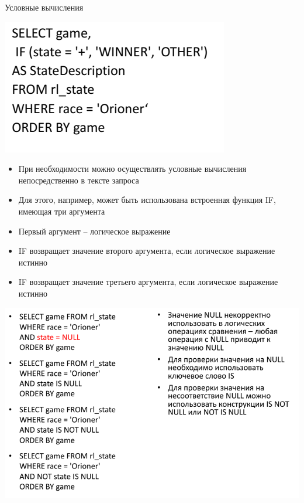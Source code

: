 \documentclass{beamer}
\begin{document}
\begin{frame}{Условные вычисления}
	\begin{minipage}{0.4\textwidth}
		\begin{flushleft}	
			\begin{center}
				\includegraphics[scale=0.5]{images/sql-05.png}
			\end{center}
		\end{flushleft}  	
	\end{minipage}
	\begin{minipage}{0.5\textwidth}
		\begin{flushright}
			\begin{itemize}
				\item При необходимости можно осуществлять условные вычисления непосредственно в тексте запроса
				\item Для этого, например, может быть использована встроенная функция IF, имеющая три аргумента
				\item Первый аргумент – логическое выражение 
				\item IF возвращает значение второго аргумента, если логическое выражение истинно
				\item IF возвращает значение третьего аргумента, если логическое выражение истинно
			\end{itemize}
		\end{flushright}
	\end{minipage}
\end{frame}

\begin{frame}
	\begin{center}
		\includegraphics[scale=0.5]{images/sql-06.png}
	\end{center}
\end{frame} 
\end{document}
